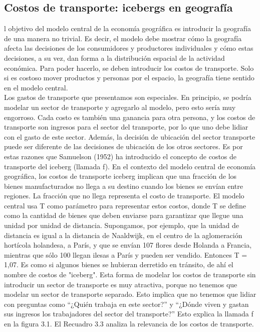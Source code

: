\subsection{Costos de transporte: icebergs en geografía}
l objetivo del modelo central de la economía geográfica es introducir la geografía de una manera no trivial. Es decir, el modelo debe mostrar cómo la geografía afecta las decisiones de los consumidores y productores individuales y cómo estas decisiones, a su vez, dan forma a la distribución espacial de la actividad económica. Para poder hacerlo, se deben introducir los costos de transporte. Solo si es costoso mover productos y personas por el espacio, la geografía tiene sentido en el modelo central.\\
Los gastos de transporte que presentamos son especiales. En principio, se podría modelar un sector de transporte y agregarlo al modelo, pero esto sería muy engorroso. Cada costo es también una ganancia para otra persona, y los costos de transporte son ingresos para el sector del transporte, por lo que uno debe lidiar con el gasto de este sector. Además, la decisión de ubicación del sector transporte puede ser diferente de las decisiones de ubicación de los otros sectores. Es por estas razones que Samuelson (1952) ha introducido el concepto de costos de transporte del iceberg (llamada f). En el contexto del modelo central de economía geográfica, los costos de transporte iceberg implican que una fracción de los bienes manufacturados no llega a su destino cuando los bienes se envían entre regiones. La fracción que no llega representa el costo de transporte. El modelo central usa T como parámetro para representar estos costos, donde T se define como la cantidad de bienes que deben enviarse para garantizar que llegue una unidad por unidad de distancia. Supongamos, por ejemplo, que la unidad de distancia es igual a la distancia de Naaldwijk, en el centro de la aglomeración hortícola holandesa, a París, y que se envían 107 flores desde Holanda a Francia, mientras que sólo 100 llegan ilesas a París y pueden ser vendido. Entonces T = 1,07. Es como si algunos bienes se hubieran derretido en tránsito, de ahí el nombre de costos de "iceberg". Esta forma de modelar los costos de transporte sin introducir un sector de transporte es muy atractiva, porque no tenemos que modelar un sector de transporte separado. Esto implica que no tenemos que lidiar con preguntas como “¿Quién trabaja en este sector?” y “¿Dónde viven y gastan sus ingresos los trabajadores del sector del transporte?” Esto explica la llamada f en la figura 3.1. El Recuadro 3.3 analiza la relevancia de los costos de transporte. \\
